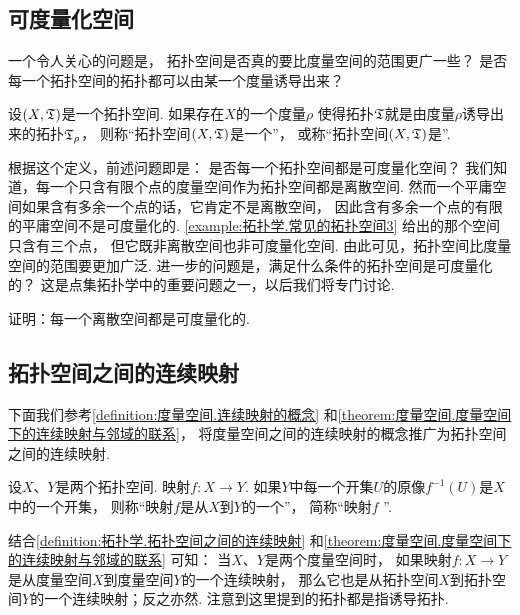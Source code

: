 \subsection{可度量化空间}
一个令人关心的问题是，
拓扑空间是否真的要比度量空间的范围更广一些？
是否每一个拓扑空间的拓扑都可以由某一个度量诱导出来？

\begin{definition}
设\((X,\mathfrak T)\)是一个拓扑空间.
如果存在\(X\)的一个度量\(\rho\)
使得拓扑\(\mathfrak T\)就是由度量\(\rho\)诱导出来的拓扑\(\mathfrak T_\rho\)，
则称“拓扑空间\((X,\mathfrak T)\)是一个”，
或称“拓扑空间\((X,\mathfrak T)\)是”.
\end{definition}

根据这个定义，前述问题即是：
是否每一个拓扑空间都是可度量化空间？
我们知道，每一个只含有限个点的度量空间作为拓扑空间都是离散空间.
然而一个平庸空间如果含有多余一个点的话，它肯定不是离散空间，
因此含有多余一个点的有限的平庸空间不是可度量化的.
\cref{example:拓扑学.常见的拓扑空间3} 给出的那个空间只含有三个点，
但它既非离散空间也非可度量化空间.
由此可见，拓扑空间比度量空间的范围要更加广泛.
进一步的问题是，满足什么条件的拓扑空间是可度量化的？
这是点集拓扑学中的重要问题之一，以后我们将专门讨论.

\begin{example}
证明：每一个离散空间都是可度量化的.
\end{example}

\subsection{拓扑空间之间的连续映射}
下面我们参考\cref{definition:度量空间.连续映射的概念}
和\cref{theorem:度量空间.度量空间下的连续映射与邻域的联系}，
将度量空间之间的连续映射的概念推广为拓扑空间之间的连续映射.

\begin{definition}\label{definition:拓扑学.拓扑空间之间的连续映射}
设\(X\)、\(Y\)是两个拓扑空间.
映射\(f\colon X \to Y\).
如果\(Y\)中每一个开集\(U\)的原像\(f^{-1}(U)\)是\(X\)中的一个开集，
则称“映射\(f\)是从\(X\)到\(Y\)的一个”，
简称“映射\(f\) ”.
\end{definition}
结合\cref{definition:拓扑学.拓扑空间之间的连续映射}
和\cref{theorem:度量空间.度量空间下的连续映射与邻域的联系} 可知：
当\(X\)、\(Y\)是两个度量空间时，
如果映射\(f\colon X \to Y\)是从度量空间\(X\)到度量空间\(Y\)的一个连续映射，
那么它也是从拓扑空间\(X\)到拓扑空间\(Y\)的一个连续映射；反之亦然.
注意到这里提到的拓扑都是指诱导拓扑.

